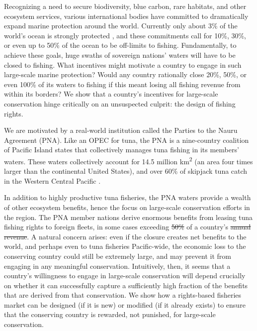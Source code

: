\documentclass[12pt]{article}
\providecommand{\DIFaddtex}[1]{{\protect\color{blue}\uwave{#1}}} %
\providecommand{\DIFdeltex}[1]{{\protect\color{red}\sout{#1}}}                      %
\providecommand{\DIFaddbegin}{} %
\providecommand{\DIFaddend}{} %
\providecommand{\DIFdelbegin}{} %
\providecommand{\DIFdelend}{} %
\providecommand{\DIFadd}[1]{\texorpdfstring{\DIFaddtex{#1}}{#1}} %
\providecommand{\DIFdel}[1]{\texorpdfstring{\DIFdeltex{#1}}{}} %
\newcommand{\DIFscaledelfig}{0.5}
\newlength{\DIFdelgraphicswidth} %
\newlength{\DIFdelgraphicsheight} %
\newcommand{\DIFaddincludegraphics}[2][]{{\color{blue}\fbox{\DIFOincludegraphics[#1]{#2}}}} %
\newcommand{\DIFdelincludegraphics}[2][]{%
\sbox{\DIFdelgraphicsbox}{\DIFOincludegraphics[#1]{#2}}%
\settoboxwidth{\DIFdelgraphicswidth}{\DIFdelgraphicsbox} %
\settoboxtotalheight{\DIFdelgraphicsheight}{\DIFdelgraphicsbox} %
\scalebox{\DIFscaledelfig}{%
\parbox[b]{\DIFdelgraphicswidth}{\usebox{\DIFdelgraphicsbox}\\[-\baselineskip] \rule{\DIFdelgraphicswidth}{0em}}\llap{\resizebox{\DIFdelgraphicswidth}{\DIFdelgraphicsheight}{%
\setlength{\unitlength}{\DIFdelgraphicswidth}%
\begin{picture}(1,1)%
\thicklines\linethickness{2pt} %
{\color[rgb]{1,0,0}\put(0,0){\framebox(1,1){}}}%
{\color[rgb]{1,0,0}\put(0,0){\line( 1,1){1}}}%
{\color[rgb]{1,0,0}\put(0,1){\line(1,-1){1}}}%
\end{picture}%
}\hspace*{3pt}}} %
} %
\DeclareRobustCommand{\DIFaddbegin}{\DIFOaddbegin \let\includegraphics\DIFaddincludegraphics} %
\DeclareRobustCommand{\DIFaddend}{\DIFOaddend \let\includegraphics\DIFOincludegraphics} %
\DeclareRobustCommand{\DIFdelbegin}{\DIFOdelbegin \let\includegraphics\DIFdelincludegraphics} %
\DeclareRobustCommand{\DIFdelend}{\DIFOaddend \let\includegraphics\DIFOincludegraphics} %
\begin{document}





Recognizing a need to secure biodiversity, blue carbon, rare habitats, and other ecosystem services, various international bodies have committed to dramatically expand marine protection around the world. Currently only about 3\% of the world's ocean is strongly protected \cite{sala_2018}, and these commitments call for 10\%, 30\%, or even up to 50\% of the ocean to be off-limits to fishing. Fundamentally, to achieve these goals, huge swaths of sovereign nations' waters will have to be closed to fishing. What incentives might motivate a country to engage in such large-scale marine protection? Would any country rationally close 20\%, 50\%, or even 100\% of its waters to fishing if this meant losing all fishing revenue from within its borders? We show that a country's incentives for large-scale conservation hinge critically on an unsuspected culprit: the design of fishing rights.

We are motivated by a real-world institution called the Parties to the Nauru Agreement (PNA). Like an OPEC for tuna, the PNA is a nine-country coalition of Pacific Island states that collectively manages tuna fishing in its members' waters\cite{havice_2013,aqorau_2018}. These waters collectively account for 14.5 million km\textsuperscript{2} (an area four times larger than the continental United States), and over 60\% of skipjack tuna catch in the Western Central Pacific \cite{havice_2013}.

In addition to highly productive tuna fisheries, the PNA waters provide a wealth of other ecosystem benefits, hence the focus on large-scale conservation efforts in the region. The PNA member nations derive enormous benefits from leasing tuna fishing rights to foreign fleets, in some cases exceeding \DIFdelbegin \DIFdel{50\% }\DIFdelend \DIFaddbegin \DIFadd{half }\DIFaddend of a country's \DIFdelbegin \DIFdel{annual revenue}\DIFdelend \DIFaddbegin \DIFadd{GDP}\DIFaddend . A natural concern arises: even if the closure creates net benefits to the world, and perhaps even to tuna fisheries Pacific-wide, the economic loss to the conserving country could still be extremely large, and may prevent it from engaging in any meaningful conservation. Intuitively, then, it seems that a country's willingness to engage in large-scale conservation will depend crucially on whether it can successfully capture a sufficiently high fraction of the benefits that are derived from that conservation. We show how a rights-based fisheries market can be designed (if it is new) or modified (if it already exists) to ensure that the conserving country is rewarded, not punished, for large-scale conservation.
\end{document}
